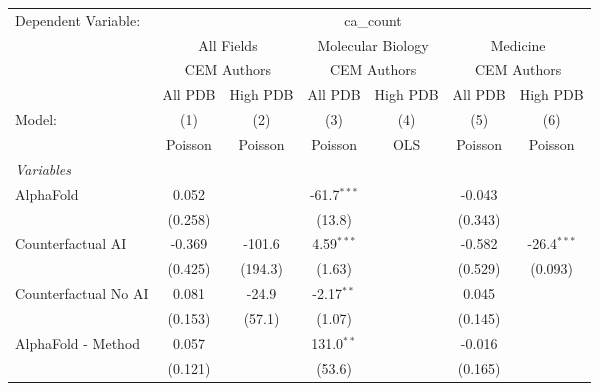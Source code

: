 \begingroup
\centering
\begin{tabular}{lcccccc}
   \tabularnewline \midrule \midrule
   Dependent Variable: & \multicolumn{6}{c}{ca\_count}\\
 & \multicolumn{2}{c}{All Fields} & \multicolumn{2}{c}{Molecular Biology} & \multicolumn{2}{c}{Medicine} \\
\cmidrule(lr){2-3} \cmidrule(lr){4-5} \cmidrule(lr){6-7}
 & \multicolumn{2}{c}{CEM Authors} & \multicolumn{2}{c}{CEM Authors} & \multicolumn{2}{c}{CEM Authors} \\
\cmidrule(lr){2-3} \cmidrule(lr){4-5} \cmidrule(lr){6-7}
 & \multicolumn{1}{c}{All PDB} & \multicolumn{1}{c}{High PDB} & \multicolumn{1}{c}{All PDB} & \multicolumn{1}{c}{High PDB} & \multicolumn{1}{c}{All PDB} & \multicolumn{1}{c}{High PDB} \\
\cmidrule(lr){2-2} \cmidrule(lr){3-3} \cmidrule(lr){4-4} \cmidrule(lr){5-5} \cmidrule(lr){6-6} \cmidrule(lr){7-7}
   Model:                                                     & (1)          & (2)     & (3)           & (4)  & (5)     & (6)\\  
                                                              &  Poisson     & Poisson & Poisson       & OLS  & Poisson & Poisson\\  
   \midrule
   \emph{Variables}\\
   AlphaFold                                                  & 0.052        &         & -61.7$^{***}$ &      & -0.043  &   \\   
                                                              & (0.258)      &         & (13.8)        &      & (0.343) &   \\   
   Counterfactual AI                                          & -0.369       & -101.6  & 4.59$^{***}$  &      & -0.582  & -26.4$^{***}$\\   
                                                              & (0.425)      & (194.3) & (1.63)        &      & (0.529) & (0.093)\\   
   Counterfactual No AI                                       & 0.081        & -24.9   & -2.17$^{**}$  &      & 0.045   &   \\   
                                                              & (0.153)      & (57.1)  & (1.07)        &      & (0.145) &   \\   
   AlphaFold - Method                                         & 0.057        &         & 131.0$^{**}$  &      & -0.016  &   \\   
                                                              & (0.121)      &         & (53.6)        &      & (0.165) &   \\   

\end{tabular}
